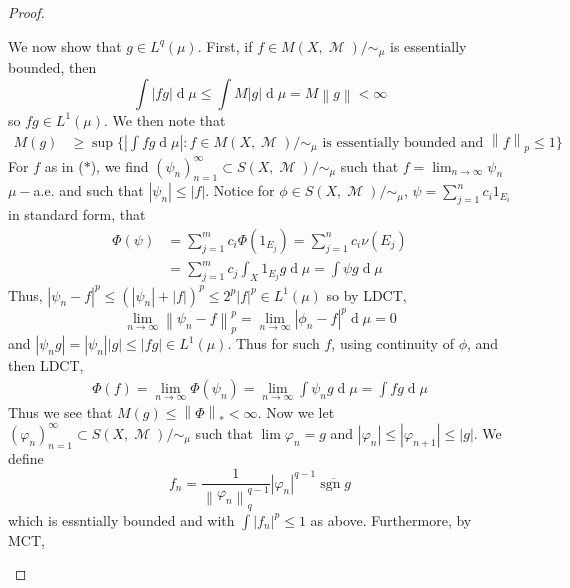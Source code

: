 \documentclass[11pt, a4paper]{memoir}
\newcommand{\norm}[1]{\ensuremath{\left\lVert#1\right\rVert}}
\newcommand{\ol}[1]{\ensuremath{\overline{#1}}}
\theoremstyle{change}
\theoremstyle{plain}
\theoremstyle{nonumberplain}
\newtheorem{proof}{Proof}
\DeclareMathOperator{\M}{{\mathcal{M}}}
\DeclareMathOperator{\sgn}{sgn}
\renewcommand{\d}[1]{\ensuremath{\operatorname{d}\!{#1}}}
\numberwithin{equation}{section}
\begin{document}
\begin{proof}
\begin{enumerate}[r]
            We now show that $g\in L^q(\mu)$.
            First, if $f\in M(X,\M)/\sim_\mu$ is essentially bounded, then
            \begin{equation*}
                \int|fg|\d{\mu}\leq\int M|g|\d{\mu}=M\norm{g}<\infty
            \end{equation*}
            so $fg\in L^1(\mu)$.
            We then note that
            \begin{align*}
                M(g) &\geq \sup\{\left\lvert\int fg\d{\mu}\right\rvert:f\in M(X,\M)/\sim_\mu\text{ is essentially bounded and }\norm{f}_p\leq 1\}\tag{$*$}
            \end{align*}
            For $f$ as in ($*$), we find $(\psi_n)_{n=1}^\infty\subset S(X,\M)/\sim_\mu$ such that $f=\lim_{n\to\infty}\psi_n$ $\mu-$a.e. and such that $|\psi_n|\leq|f|$.
            Notice for $\phi\in S(X,\M)/\sim_\mu$, $\psi=\sum_{j=1}^n c_i1_{E_i}$ in standard form, that
            \begin{align*}
                \Phi(\psi)&= \sum_{j=1}^m c_i\Phi(1_{E_j})=\sum_{j=1}^n c_i\nu(E_j)\\
                          &=\sum_{j=1}^m c_j\int_X 1_{E_j}g\d{\mu}=\int\psi g\d{\mu}
            \end{align*}
            Thus, $|\psi_n-f|^p\leq(|\psi_n|+|f|)^p\leq 2^p|f|^p\in L^1(\mu)$ so by LDCT,
            \begin{equation*}
                \lim_{n\to\infty}\norm{\psi_n-f}_p^p=\lim_{n\to\infty}|\phi_n-f|^p\d{\mu}=0
            \end{equation*}
            and $|\psi_ng|=|\psi_n||g|\leq|fg|\in L^1(\mu)$.
            Thus for such $f$, using continuity of $\phi$, and then LDCT,
            \begin{align*}
                \Phi(f)=\lim_{n\to\infty}\Phi(\psi_n)=\lim_{n\to\infty}\int\psi_n g\d{\mu}=\int fg\d{\mu}
            \end{align*}
            Thus we see that $M(g)\leq\norm{\Phi}_*<\infty$.
            Now we let $(\varphi_n)_{n=1}^\infty\subset S(X,\M)/\sim_\mu$ such that $\lim\varphi_n=g$ and $|\varphi_n|\leq|\varphi_{n+1}|\leq|g|$.
            We define
            \begin{equation*}
                f_n=\frac{1}{\norm{\varphi_n}_q^{q-1}}|\varphi_n|^{q-1}\ol{\sgn g}
            \end{equation*}
            which is essntially bounded and with $\int|f_n|^p\leq 1$ as above.
            Furthermore, by MCT,
            \begin{equation*}

\end{equation*}
\end{enumerate}
\end{proof}
\end{document}
